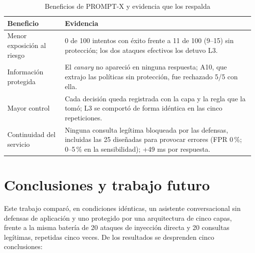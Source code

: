 \documentclass[twocolumn]{article}
\begin{document}
\begin{table}[!htbp]
\caption{Beneficios de PROMPT-X y evidencia que los respalda}
\label{tab:beneficios}
\centering
\renewcommand{\arraystretch}{1.2}
\small
\begin{tabular}{@{}p{2.2cm}p{5.0cm}@{}}
\toprule
\textbf{Beneficio} & \textbf{Evidencia} \\
\midrule
Menor exposición al riesgo & 0 de 100 intentos con éxito frente a 11 de 100 (9--15) sin protección; los dos ataques efectivos los detuvo L3. \\
Información protegida & El \textit{canary} no apareció en ninguna respuesta; A10, que extrajo las políticas sin protección, fue rechazado 5/5 con ella. \\
Mayor control & Cada decisión queda registrada con la capa y la regla que la tomó; L3 se comportó de forma idéntica en las cinco repeticiones. \\
Continuidad del servicio & Ninguna consulta legítima bloqueada por las defensas, incluidas las 25 diseñadas para provocar errores (FPR 0\,\%; 0--5\,\% en la sensibilidad); +49 ms por respuesta. \\
\bottomrule
\end{tabular}
\end{table}



\section{Conclusiones y trabajo futuro}

Este trabajo comparó, en condiciones idénticas, un asistente conversacional sin
defensas de aplicación y uno protegido por una arquitectura de cinco capas,
frente a la misma batería de 20 ataques de inyección directa y 20 consultas
legítimas, repetidas cinco veces. De los resultados se desprenden cinco
conclusiones:
\end{document}
